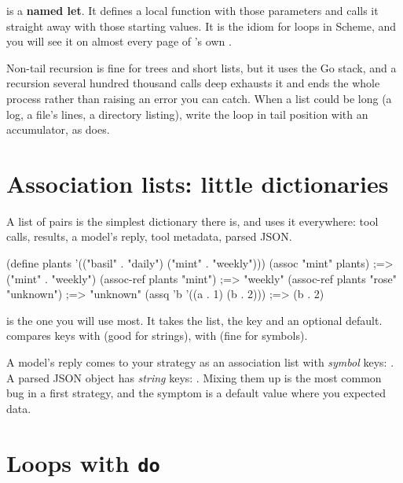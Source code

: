  is a \textbf{named let}. It
defines a local function  with those parameters and calls it
straight away with those starting values. It is the idiom for loops in
Scheme, and you will see it on almost every page of \nodwyn's own
.

\begin{careful}
Non-tail recursion is fine for trees and short lists, but it uses the Go
stack, and a recursion several hundred thousand calls deep exhausts it
and ends the whole process rather than raising an error you can catch. When
a list could be long (a log, a file's lines, a directory listing), write the
loop in tail position with an accumulator, as  does.
\end{careful}

\section{Association lists: little dictionaries}

A list of pairs is the simplest dictionary there is, and \nodwyn{} uses it
everywhere: tool calls, results, a model's reply, tool metadata, parsed
JSON.

\begin{scm}
(define plants '(("basil" . "daily") ("mint" . "weekly")))
(assoc "mint" plants)                ;=> ("mint" . "weekly")
(assoc-ref plants "mint")            ;=> "weekly"
(assoc-ref plants "rose" "unknown")  ;=> "unknown"
(assq 'b '((a . 1) (b . 2)))         ;=> (b . 2)
\end{scm}

 is the one you will use most. It takes the list, the key
and an optional default.  compares keys with 
(good for strings),  with  (fine for symbols).

\begin{tip}
A model's reply comes to your strategy as an association list with
\emph{symbol} keys: . A parsed JSON
object has \emph{string} keys: . Mixing them
up is the most common bug in a first strategy, and the symptom is a
default value where you expected data.
\end{tip}

\section{Loops with \texttt{do}}

